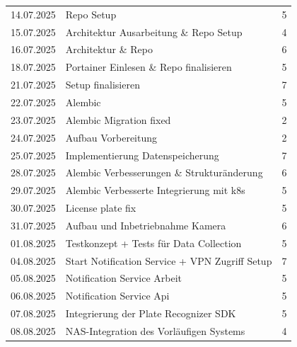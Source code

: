 \begin{longtable}{|c|l|r|}
    14.07.2025      & Repo Setup                                     & 5                         \\
    15.07.2025      & Architektur Ausarbeitung \& Repo Setup         & 4                         \\
    16.07.2025      & Architektur \& Repo                            & 6                         \\
    18.07.2025      & Portainer Einlesen \& Repo finalisieren        & 5                         \\
    21.07.2025      & Setup finalisieren                             & 7                         \\
    22.07.2025      & Alembic                                        & 5                         \\
    23.07.2025      & Alembic Migration fixed                        & 2                         \\
    24.07.2025      & Aufbau Vorbereitung                            & 2                         \\
    25.07.2025      & Implementierung Datenspeicherung               & 7                         \\
    28.07.2025      & Alembic Verbesserungen \& Strukturänderung     & 6                         \\
    29.07.2025      & Alembic Verbesserte Integrierung mit k8s       & 5                         \\
    30.07.2025      & License plate fix                              & 5                         \\
    31.07.2025      & Aufbau und Inbetriebnahme Kamera               & 6                         \\
    01.08.2025      & Testkonzept + Tests für Data Collection        & 5                         \\
    04.08.2025      & Start Notification Service + VPN Zugriff Setup & 7                         \\
    05.08.2025      & Notification Service Arbeit                    & 5                         \\
    06.08.2025      & Notification Service Api                       & 5                         \\
    07.08.2025      & Integrierung der Plate Recognizer SDK          & 5                         \\
    08.08.2025      & NAS-Integration des Vorläufigen Systems        & 4                         \\

\end{longtable}
